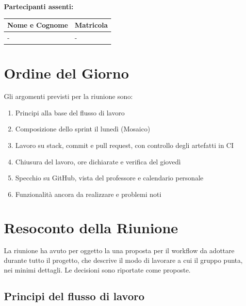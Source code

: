 \documentclass[a4paper, 11pt]{article}
\begin{document}
\vspace{0.5cm}
\textbf{Partecipanti assenti:}
\begin{center}
\renewcommand{\arraystretch}{1.5}
\begin{tabularx}{0.8\textwidth}{|>{\arraybackslash}X|>{\centering\arraybackslash}p{2cm}|}
\hline
\textbf{Nome e Cognome} & \textbf{Matricola} \\ \hline
- & - \\ \hline
\end{tabularx}
\end{center}

\vspace{0.5cm}
\section{Ordine del Giorno}

Gli argomenti previsti per la riunione sono:
\begin{enumerate}
  \item Principi alla base del flusso di lavoro
  \item Composizione dello sprint il luned\`i (Mosaico)
  \item Lavoro su stack, commit e pull request, con controllo degli artefatti in CI
  \item Chiusura del lavoro, ore dichiarate e verifica del gioved\`i
  \item Specchio su GitHub, vista del professore e calendario personale
  \item Funzionalit\`a ancora da realizzare e problemi noti
\end{enumerate}

\section{Resoconto della Riunione}

La riunione ha avuto per oggetto la una proposta per il workflow da adottare durante tutto il progetto, che descrive il modo di lavorare a cui il gruppo punta, nei minimi dettagli. \newline Le decisioni sono riportate come proposte.

\subsection{Principi del flusso di lavoro}
\end{document}
